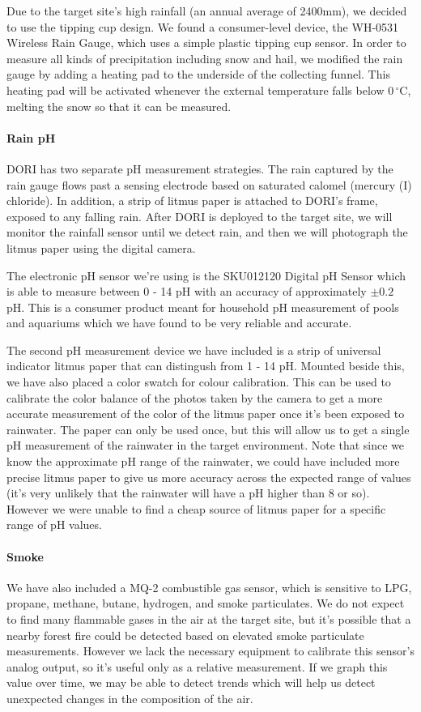 \documentclass[12pt]{article}
\newcommand{\brand}{}
\newcommand{\degrees}{\,^{\circ}\mathrm{C}}
\begin{document}
Due to the target site's high rainfall (an annual average of 2400mm\cite{rainfall}), we decided to use the tipping cup design. We found a consumer-level device, the \textsc{WH-0531} Wireless Rain Gauge, which uses a simple plastic tipping cup sensor. In order to measure all kinds of precipitation including snow and hail, we modified the rain gauge by adding a heating pad to the underside of the collecting funnel. This heating pad will be activated whenever the external temperature falls below $0\degrees{}$, melting the snow so that it can be measured.


    \paragraph*{Rain pH}
DORI has two separate pH measurement strategies. The rain captured by the rain gauge flows past a sensing electrode based on saturated calomel (mercury (I) chloride). In addition, a strip of litmus paper is attached to DORI's frame, exposed to any falling rain. After DORI is deployed to the target site, we will monitor the rainfall sensor until we detect rain, and then we will photograph the litmus paper using the digital camera.

The electronic pH sensor we're using is the \brand{SKU012120} Digital pH Sensor which is able to measure between 0 - 14 pH with an accuracy of approximately $\pm0.2$ pH. This is a consumer product meant for household pH measurement of pools and aquariums which we have found to be very reliable and accurate.

The second pH measurement device we have included is a strip of universal indicator litmus paper that can distingush from 1 - 14 pH. Mounted beside this, we have also placed a color swatch for colour calibration. This can be used to calibrate the color balance of the photos taken by the camera to get a more accurate measurement of the color of the litmus paper once it's been exposed to rainwater. The paper can only be used once, but this will allow us to get a single pH measurement of the rainwater in the target environment. Note that since we know the approximate pH range of the rainwater, we could have included more precise litmus paper to give us more accuracy across the expected range of values (it's very unlikely that the rainwater will have a pH higher than 8 or so). However we were unable to find a cheap source of litmus paper for a specific range of pH values.

    \paragraph*{Smoke}
    We have also included a \brand{MQ-2} combustible gas sensor, which is sensitive to LPG, propane, methane, butane, hydrogen, and smoke particulates. We do not expect to find many flammable gases in the air at the target site, but it's possible that a nearby forest fire could be detected based on elevated smoke particulate measurements. However we lack the necessary equipment to calibrate this sensor's analog output, so it's useful only as a relative measurement. If we graph this value over time, we may be able to detect trends which will help us detect unexpected changes in the composition of the air.
\end{document}

